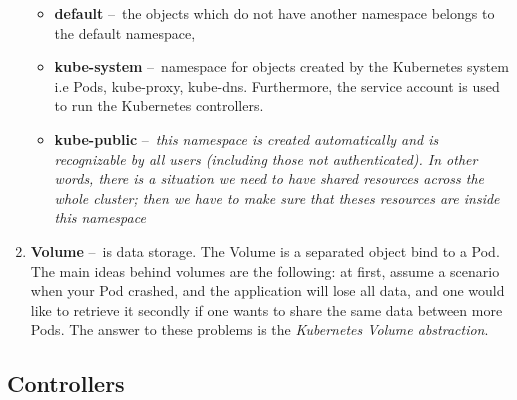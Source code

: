 \begin{enumerate}[itemsep=1mm, parsep=0pt]
        \begin{itemize}
            \item \textbf{default} \---\ the objects which do not have another namespace belongs to the default namespace,
            \item \textbf{kube-system} \---\ namespace for objects created by the Kubernetes system i.e Pods, kube-proxy, kube-dns. Furthermore, the service account is used to run the Kubernetes controllers.
            \item \textbf{kube-public} \---\ \textit{this namespace is created automatically and is recognizable by all users (including those not authenticated). In other words, there is a situation we need to have shared resources across the whole cluster; then we have to make sure that theses resources are inside this namespace} \cite{namespaceTypes}
        \end{itemize}
    
    \item \textbf{Volume} \---\ is data storage. The Volume is a separated object bind to a Pod. The main ideas behind volumes are the following: at first, assume a scenario when your Pod crashed, and the application will lose all data, and one would like to retrieve it secondly if one wants to share the same data between more Pods. The answer to these problems is the \emph{Kubernetes Volume abstraction}.
\end{enumerate}

\subsection{Controllers}

